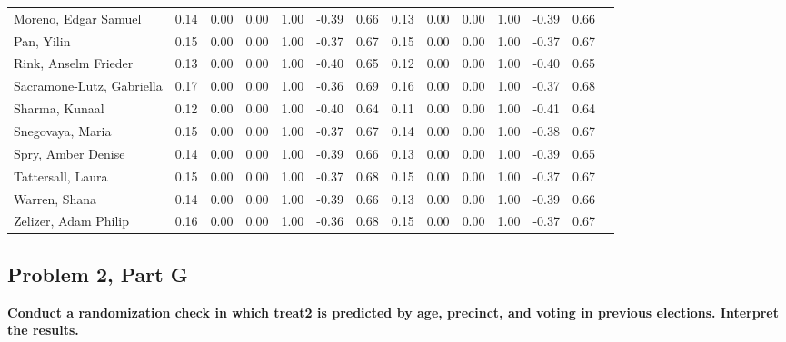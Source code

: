 \documentclass[11pt,notitlepage]{article}
\begin{document}
\begin{table}[h!]
\begin{center}
\begin{tabular}{lrrrrrrr|rrrrrr}
  Moreno, Edgar Samuel & 0.14 & 0.00 & 0.00 & 1.00 & -0.39 & 0.66 & 0.13 & 0.00 & 0.00 & 1.00 & -0.39 & 0.66 &  \\ 
  Pan, Yilin & 0.15 & 0.00 & 0.00 & 1.00 & -0.37 & 0.67 & 0.15 & 0.00 & 0.00 & 1.00 & -0.37 & 0.67 &  \\ 
  Rink, Anselm Frieder & 0.13 & 0.00 & 0.00 & 1.00 & -0.40 & 0.65 & 0.12 & 0.00 & 0.00 & 1.00 & -0.40 & 0.65 &  \\ 
  Sacramone-Lutz, Gabriella & 0.17 & 0.00 & 0.00 & 1.00 & -0.36 & 0.69 & 0.16 & 0.00 & 0.00 & 1.00 & -0.37 & 0.68 &  \\ 
  Sharma, Kunaal & 0.12 & 0.00 & 0.00 & 1.00 & -0.40 & 0.64 & 0.11 & 0.00 & 0.00 & 1.00 & -0.41 & 0.64 &  \\ 
  Snegovaya, Maria & 0.15 & 0.00 & 0.00 & 1.00 & -0.37 & 0.67 & 0.14 & 0.00 & 0.00 & 1.00 & -0.38 & 0.67 &  \\ 
  Spry, Amber Denise & 0.14 & 0.00 & 0.00 & 1.00 & -0.39 & 0.66 & 0.13 & 0.00 & 0.00 & 1.00 & -0.39 & 0.65 &  \\ 
  Tattersall, Laura & 0.15 & 0.00 & 0.00 & 1.00 & -0.37 & 0.68 & 0.15 & 0.00 & 0.00 & 1.00 & -0.37 & 0.67 &  \\ 
  Warren, Shana & 0.14 & 0.00 & 0.00 & 1.00 & -0.39 & 0.66 & 0.13 & 0.00 & 0.00 & 1.00 & -0.39 & 0.66 &  \\ 
  Zelizer, Adam Philip & 0.16 & 0.00 & 0.00 & 1.00 & -0.36 & 0.68 & 0.15 & 0.00 & 0.00 & 1.00 & -0.37 & 0.67 &  \\ 
   \hline
\end{tabular}
\end{center}
\end{table}

\clearpage

\subsection{Problem 2, Part G} {\bf Conduct a randomization check in which treat2 is predicted by age, precinct, and voting in previous elections.  Interpret the results.}

\vspace{1cm}
\end{document}
